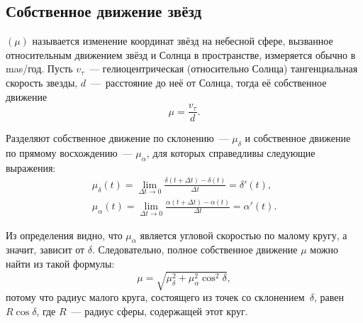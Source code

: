 \subsection{Собственное движение звёзд}
 $(\mu)$ называется изменение координат звёзд на небесной сфере, вызванное относительным движением звёзд и Солнца в пространстве, измеряется обычно в mas/год. Пусть $v_\tau$~--- гелиоцентрическая (относительно Солнца) тангенциальная скорость звезды, $d$~---~расстояние до неё от Солнца, тогда её собственное движение
\begin{equation}
	\mu = \frac{v_\tau}{d}.
\end{equation}

Разделяют собственное движение по склонению~--- $\mu_\delta$ и собственное движение по прямому восхождению~--- $\mu_\alpha$, для которых справедливы следующие выражения:
\begin{gather}
	\mu_\delta(t) = \lim_{\Delta t \rightarrow 0} \frac{\delta(t + \Delta t) - \delta(t)}{\Delta t} = \delta'(t),\\
	\mu_\alpha(t) = \lim_{\Delta t \rightarrow 0} \frac{\alpha(t + \Delta t) - \alpha(t)}{\Delta t} = \alpha'(t).
\end{gather}

Из определения видно, что $\mu_\alpha$ является угловой скоростью по малому кругу, а значит, зависит от $\delta$. Следовательно, полное собственное движение $\mu$ можно найти из такой формулы:
\begin{equation}
	\mu = \sqrt{\mu_\delta^2 + \mu_\alpha^2 \cos^2 \delta},
\end{equation}
потому что радиус малого круга, состоящего из точек со склонением~$\delta$, равен $R \cos \delta$, где $R$~--- радиус сферы, содержащей этот круг.


